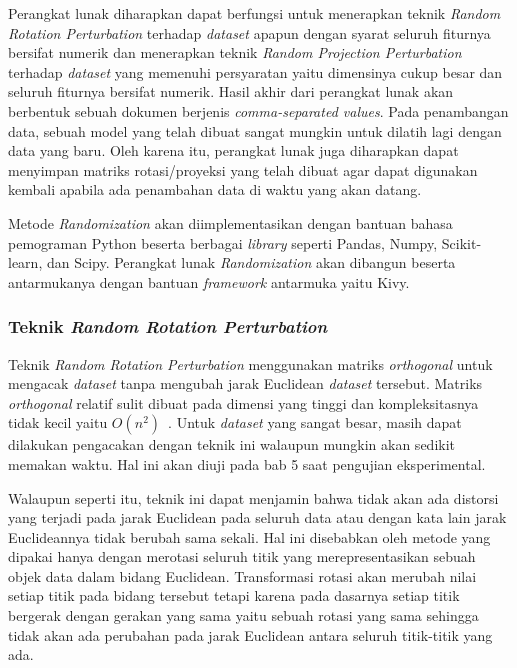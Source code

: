 Perangkat lunak diharapkan dapat berfungsi untuk menerapkan teknik \textit{Random Rotation Perturbation} terhadap \textit{dataset} apapun dengan syarat seluruh fiturnya bersifat numerik dan menerapkan teknik \textit{Random Projection Perturbation} terhadap \textit{dataset} yang memenuhi persyaratan yaitu dimensinya cukup besar dan seluruh fiturnya bersifat numerik. Hasil akhir dari perangkat lunak akan berbentuk sebuah dokumen berjenis \textit{comma-separated values}. Pada penambangan data, sebuah model yang telah dibuat sangat mungkin untuk dilatih lagi dengan data yang baru. Oleh karena itu, perangkat lunak juga diharapkan dapat menyimpan matriks rotasi/proyeksi yang telah dibuat agar dapat digunakan kembali apabila ada penambahan data di waktu yang akan datang.

Metode \textit{Randomization} akan diimplementasikan dengan bantuan bahasa pemograman Python beserta berbagai \textit{library} seperti Pandas, Numpy, Scikit-learn, dan Scipy. Perangkat lunak \textit{Randomization} akan dibangun beserta antarmukanya dengan bantuan \textit{framework} antarmuka yaitu Kivy.

\subsubsection{Teknik \textit{Random Rotation Perturbation}}
\label{subsubsec:analisis-rrp}

Teknik \textit{Random Rotation Perturbation} menggunakan matriks \textit{orthogonal} untuk mengacak \textit{dataset} tanpa mengubah jarak Euclidean \textit{dataset} tersebut. Matriks \textit{orthogonal} relatif sulit dibuat pada dimensi yang tinggi dan kompleksitasnya tidak kecil yaitu \(O(n^2)\)~\cite{stewart:80:orthogonal}. Untuk \textit{dataset} yang sangat besar, masih dapat dilakukan pengacakan dengan teknik ini walaupun mungkin akan sedikit memakan waktu. Hal ini akan diuji pada bab 5 saat pengujian eksperimental.

Walaupun seperti itu, teknik ini dapat menjamin bahwa tidak akan ada distorsi yang terjadi pada jarak Euclidean pada seluruh data atau dengan kata lain jarak Euclideannya tidak berubah sama sekali. Hal ini disebabkan oleh metode yang dipakai hanya dengan merotasi seluruh titik yang merepresentasikan sebuah objek data dalam bidang Euclidean. Transformasi rotasi akan merubah nilai setiap titik pada bidang tersebut tetapi karena pada dasarnya setiap titik bergerak dengan gerakan yang sama yaitu sebuah rotasi yang sama sehingga tidak akan ada perubahan pada jarak Euclidean antara seluruh titik-titik yang ada.

